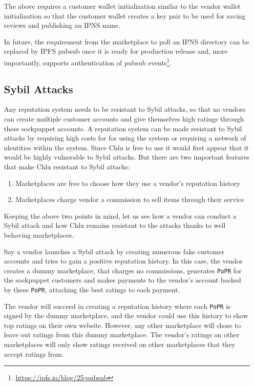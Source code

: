 \documentclass[a4paper]{article}
\begin{document}
The above requires a customer wallet initialization similar to the
vendor wallet initialization so that the customer wallet creates a key
pair to be used for saving reviews and publishing an IPNS name.

In future, the requirement from the marketplace to poll an IPNS
directory can be replaced by IPFS pubsub once it is ready for
production release and, more importantly, supports authentication of
pubsub events\footnote{\url{https://ipfs.io/blog/25-pubsub}}.

\subsection{Sybil Attacks}

Any reputation system needs to be resistant to Sybil attacks, so that
no vendors can create multiple customer accounts and give themselves
high ratings through these sockpuppet accounts. A reputation system
can be made resistant to Sybil attacks by requiring high costs for for
using the system or requiring a network of identities within the
system. Since Chlu is free to use it would first appear that it would
be highly vulnerable to Sybil attacks. But there are two important
features that make Chlu resistant to Sybil attacks:

\begin{enumerate}
\item Marketplaces are free to choose how they use a vendor's reputation
  history
\item Marketplaces charge vendor a commission to sell items through
  their service
\end{enumerate}

Keeping the above two points in mind, let us see how a vendor can
conduct a Sybil attack and how Chlu remains resistant to the attacks
thanks to well behaving marketplaces.

Say a vendor launches a Sybil attack by creating numerous fake
customer accounts and tries to gain a positive reputation history. In
this case, the vendor creates a dummy marketplace, that charges no
commissions, generates \texttt{PoPR} for the sockpuppet customers and
makes payments to the vendor's account backed by these \texttt{PoPR},
attaching the best ratings to each payment.

The vendor will succeed in creating a reputation history where each
\texttt{PoPR} is signed by the dummy marketplace, and the vendor could
use this history to show top ratings on their own website. However, any
other marketplace will chose to leave out ratings from this dummy
marketplace. The vendor's ratings on other marketplaces will only show
ratings received on other marketplaces that they accept ratings from.
\end{document}
